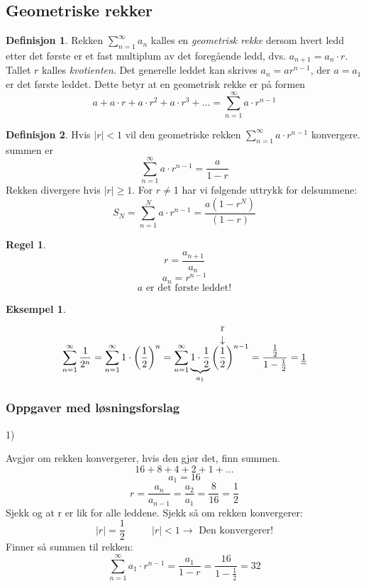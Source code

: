 \documentclass[11pt]{article}
\theoremstyle{definition}
\newtheorem{mindef}{Definisjon}[section]
\newenvironment{fmindef}
{\begin{mdframed}[style=minstil]\begin{mindef}}
		{\end{mindef}\end{mdframed}}
\theoremstyle{definition}
\newtheorem{mitteks}{Eksempel}[section]
\theoremstyle{definition}
\theoremstyle{definition}
\theoremstyle{definition}
\newtheorem{regel}{Regel}
\newenvironment{fregel}
{\begin{mdframed}[style=minstil]\begin{regel}}
		{\end{regel}\end{mdframed}}
\theoremstyle{definition}
\begin{document}
		\subsection{Geometriske rekker}
		
		\begin{fmindef}
			Rekken \(\sum_{n=1}^{\infty}a_n\) kalles en \textit{geometrisk rekke} dersom hvert ledd etter det første er et fast multiplum av det foregående ledd, dvs. \(a_{n+1}=a_n\cdot r\). Tallet \(r\) kalles \textit{kvotienten}. Det generelle leddet kan skrives \(a_n=ar^{n-1}\), der \(a=a_1\) er det første leddet. Dette betyr at en geometrisk rekke er på formen 
			\[a+a\cdot r + a\cdot r^2 + a\cdot r^3 + ...=\sum_{n=1}^{\infty}a\cdot r^{n-1} \]		
		\end{fmindef}
		
		\begin{fmindef}
			Hvis \(|r|<1\) vil den geometriske rekken \(\sum_{n=1}^{\infty}a\cdot r^{n-1} \) konvergere. summen er 
			\[\sum_{n=1}^{\infty}a\cdot r^{n-1}=\dfrac{a}{1-r} \]
			Rekken divergere hvis \(|r|\geq 1\). For \(r\neq \)1 har vi følgende  uttrykk for delsummene:
			\[S_N=\sum_{n=1}^{N}a \cdot r^{n-1}=\dfrac{a(1-r^N
				)}{(1-r)} \]
		\end{fmindef}
		
		\begin{fregel}
			\[r=\dfrac{a_{n+1}}{a_n}\]
			\[a_n=r^{n-1}\]
			\[a \text{ er det første leddet!}\]
		\end{fregel}
		
		
		\begin{mitteks} 
			\[\sum_{n=1}^{\infty}\dfrac{1}{2^n}=\sum_{n=1}^{\infty}1 \cdot \left( \dfrac{1}{2} \right)^n=\sum_{n=1}^{\infty}\underbrace{1\cdot \frac{1}{2}}_{a_1}  \bigg( \overarrow[\dfrac{1}{2}][\downarrow]{r}  \bigg)^{n-1}= \dfrac{\frac{1}{2}}{1-\frac{1}{2}}=\underline{\underline{1} } \]
		\end{mitteks}
		
		\newpage
		
	    \subsubsection{Oppgaver med løsningsforslag}
	    	1)
	    	
	    	Avgjør om rekken konvergerer, hvis den gjør det, finn summen.
	    	\[16+8+4+2+1+...\]
	    \[a_1=16\]
	    \[r=\frac{a_n}{a_{n-1}}=\frac{a_2}{a_1}=\frac{8}{16}=\frac{1}{2}\]Sjekk og at r er lik for alle leddene. Sjekk så om rekken konvergerer:
	    \[|r|=\frac{1}{2}\hspace{32pt} |r|<1\rightarrow\text{ Den konvergerer!}\]
	    Finner så summen til rekken:
	    \[\sum_{n=1}^{\infty}a_1\cdot r^{n-1}=\dfrac{a_1}{1-r}=\dfrac{16}{1-\frac{1}{2}}=32\]
	    
\end{document}

